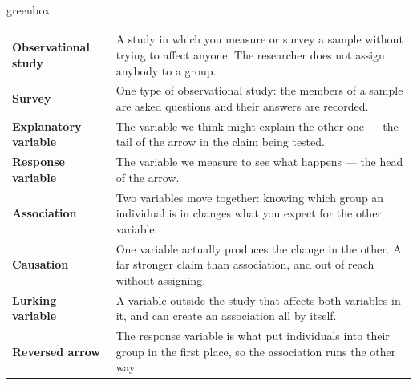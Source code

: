 \documentclass[10pt]{article}
\begin{document}
\boxguard[24]
\begin{skillbox}{greenbox}
\small
\renewcommand{\arraystretch}{1.35}
\begin{tabularx}{\linewidth}{@{} >{\bfseries}p{3.1cm} X @{}}
Observational study & A study in which you measure or survey a sample without trying to affect
       anyone. The researcher does not assign anybody to a group. \\
Survey & One type of observational study: the members of a sample are asked questions and
       their answers are recorded. \\
Explanatory variable & The variable we think might explain the other one --- the tail of the
       arrow in the claim being tested. \\
Response variable & The variable we measure to see what happens --- the head of the arrow. \\
Association & Two variables move together: knowing which group an individual is in changes
       what you expect for the other variable. \\
Causation & One variable actually produces the change in the other. A far stronger claim than
       association, and out of reach without assigning. \\
Lurking variable & A variable outside the study that affects both variables in it, and can
       create an association all by itself. \\
Reversed arrow & The response variable is what put individuals into their group in the first
       place, so the association runs the other way. \\
\end{tabularx}
\end{skillbox}
\end{document}

